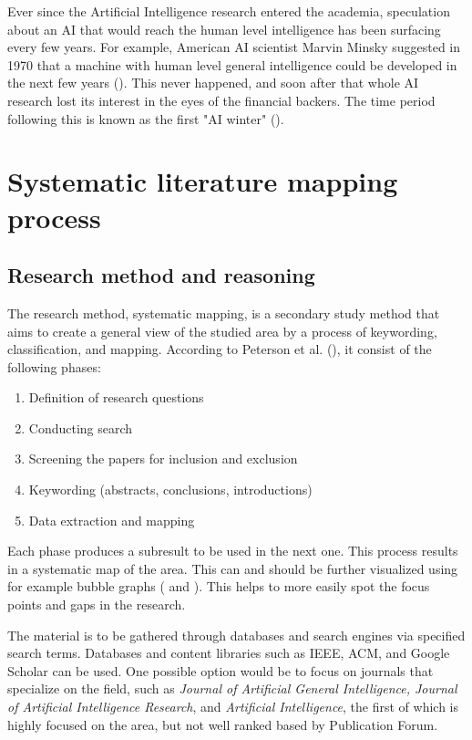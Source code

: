 \documentclass[utf8,english]{gradu3}
\begin{document}
Ever since the Artificial Intelligence research entered the academia, speculation about an AI that would reach the human level intelligence has been surfacing every few years. For example, American AI scientist Marvin Minsky suggested in 1970 that a machine with human level general intelligence could be developed in the next few years (\cite{kaplan2019}). This never happened, and soon after that whole AI research lost its interest in the eyes of the financial backers. The time period following this is known as the first "AI winter" (\cite{kaplan2019}).




\chapter{Systematic literature mapping process}

\section{Research method and reasoning}

\label{method}
The research method, systematic mapping, is a secondary study method that aims to create a general view of the studied area by a process of keywording, classification, and mapping. According to Peterson et al. (\cite*{petersen2008}), it consist of the following phases:
\begin{enumerate}
    \item Definition of research questions
    \item Conducting search
    \item Screening the papers for inclusion and exclusion
    \item Keywording (abstracts, conclusions, introductions)
    \item Data extraction and mapping
\end{enumerate}

Each phase produces a subresult to be used in the next one. This process results in a systematic map of the area. This can and should be further visualized using for example bubble graphs (\cite{mononen2018} and \cite{petersen2008}). This helps to more easily spot the focus points and gaps in the research.


The material is to be gathered through databases and search engines via specified search terms. Databases and content libraries such as IEEE, ACM, and Google Scholar can be used. One possible option would be to focus on journals that specialize on the field, such as \textit{Journal of Artificial General Intelligence, Journal of Artificial Intelligence Research}, and \textit{Artificial Intelligence}, the first of which is highly focused on the area, but not well ranked based by Publication Forum. 
\end{document}
